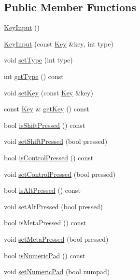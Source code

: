 \subsection*{Public Member Functions}
\begin{DoxyCompactItemize}
\item 
\hyperlink{classgcn_1_1KeyInput_ad12092919d399e0af37fbe5714194b52}{Key\+Input} ()
\item 
\hyperlink{classgcn_1_1KeyInput_a3442659a42ade002061c884f6d6ea87e}{Key\+Input} (const \hyperlink{classgcn_1_1Key}{Key} \&key, int type)
\item 
void \hyperlink{classgcn_1_1KeyInput_a033ce31e4941b269efa9dca27c186b16}{set\+Type} (int type)
\item 
int \hyperlink{classgcn_1_1KeyInput_acbb9c0d8aae09728c39e1c453cd4002e}{get\+Type} () const 
\item 
void \hyperlink{classgcn_1_1KeyInput_a889fa8c1075b3e7311aca91c21fc69bc}{set\+Key} (const \hyperlink{classgcn_1_1Key}{Key} \&key)
\item 
const \hyperlink{classgcn_1_1Key}{Key} \& \hyperlink{classgcn_1_1KeyInput_a5a626e622a953431595ac8c454c64125}{get\+Key} () const 
\item 
bool \hyperlink{classgcn_1_1KeyInput_a67e039afa82ac18a6f00cc1bfad4d2bd}{is\+Shift\+Pressed} () const 
\item 
void \hyperlink{classgcn_1_1KeyInput_adefa27624fc510521f4b2c42e01c4731}{set\+Shift\+Pressed} (bool pressed)
\item 
bool \hyperlink{classgcn_1_1KeyInput_a4d362a7920c0f8bdb38ac6427c2bb38b}{is\+Control\+Pressed} () const 
\item 
void \hyperlink{classgcn_1_1KeyInput_a3ddf1406227b339279a7f465ad2ae37a}{set\+Control\+Pressed} (bool pressed)
\item 
bool \hyperlink{classgcn_1_1KeyInput_a3ed1fea3197b183fe292c6cde6f5b182}{is\+Alt\+Pressed} () const 
\item 
void \hyperlink{classgcn_1_1KeyInput_ac3fb3252fe3be80e242580f67cb028c7}{set\+Alt\+Pressed} (bool pressed)
\item 
bool \hyperlink{classgcn_1_1KeyInput_ab72ffefad5761e03515feffaae0d17cf}{is\+Meta\+Pressed} () const 
\item 
void \hyperlink{classgcn_1_1KeyInput_a1f86e7541a8d54471d36d29a4f06fab6}{set\+Meta\+Pressed} (bool pressed)
\item 
bool \hyperlink{classgcn_1_1KeyInput_a40b3047f75cf356446df34ede695e955}{is\+Numeric\+Pad} () const 
\item 
void \hyperlink{classgcn_1_1KeyInput_a899556dc3854db963d3b4a71cf4dde7c}{set\+Numeric\+Pad} (bool numpad)
\end{DoxyCompactItemize}
